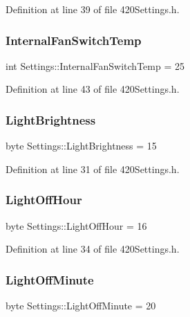 Definition at line 39 of file 420\+Settings.\+h.

\mbox{\label{struct_settings_aea53fdce9d489f7c66bcd0a4fc16dba0}} 
\subsubsection{\texorpdfstring{InternalFanSwitchTemp}{InternalFanSwitchTemp}}
{\footnotesize\ttfamily int Settings\+::\+Internal\+Fan\+Switch\+Temp = 25}



Definition at line 43 of file 420\+Settings.\+h.

\mbox{\label{struct_settings_ad5eba46ecc5a2c893aa92ed59357aeff}} 
\subsubsection{\texorpdfstring{LightBrightness}{LightBrightness}}
{\footnotesize\ttfamily byte Settings\+::\+Light\+Brightness = 15}



Definition at line 31 of file 420\+Settings.\+h.

\mbox{\label{struct_settings_ad086a1ad52a233373d8d786f2e53441c}} 
\subsubsection{\texorpdfstring{LightOffHour}{LightOffHour}}
{\footnotesize\ttfamily byte Settings\+::\+Light\+Off\+Hour = 16}



Definition at line 34 of file 420\+Settings.\+h.

\mbox{\label{struct_settings_ae36c9acdb2c193a39bcc85f63b94b3c0}} 
\subsubsection{\texorpdfstring{LightOffMinute}{LightOffMinute}}
{\footnotesize\ttfamily byte Settings\+::\+Light\+Off\+Minute = 20}




